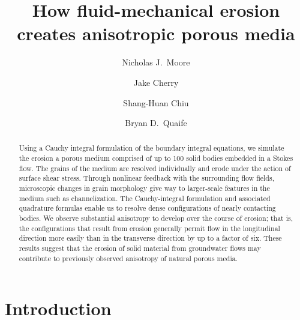 \documentclass[3p]{elsarticle}
\begin{document}
\title{How fluid-mechanical erosion creates anisotropic porous media}



\author[Colgate]{Nicholas J.~Moore}

\author[FSU]{Jake Cherry}

\author[TAMU]{Shang-Huan Chiu}

\author[FSU]{Bryan D.~Quaife}

\address[Colgate]{Colgate University}
\address[FSU]{Florida State University}
\address[TAMU]{Texas A\&M-San Antonio}

\begin{abstract}
Using a Cauchy integral formulation of the boundary integral equations, we simulate the erosion a porous medium comprised of up to 100 solid bodies embedded in a Stokes flow. The grains of the medium are resolved individually and erode under the action of surface shear stress. Through nonlinear feedback with the surrounding flow fields, microscopic changes in grain morphology give way to larger-scale features in the medium such as channelization. The Cauchy-integral formulation and associated quadrature formulas enable us to resolve dense configurations of nearly contacting bodies.
We observe substantial anisotropy to develop over the course of erosion; that is, the configurations that result from erosion generally permit flow in the longitudinal direction more easily than in the transverse direction by up to a factor of six. These results suggest that the erosion of solid material from groundwater flows may contribute to previously observed anisotropy of natural porous media.
\end{abstract}
\maketitle



\section{Introduction}
\end{document}
